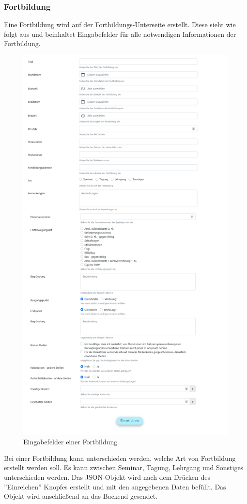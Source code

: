 \subsubsection{Fortbildung}
Eine Fortbildung wird auf der Fortbildungs-Unterseite erstellt. Diese sieht wie folgt aus und beinhaltet Eingabefelder für alle notwendigen Informationen der Fortbildung.
\begin{figure}[H]
	\centering
	\includegraphics[width=0.65\linewidth]{images/workshop}
	\caption[Fortbildung]{Eingabefelder einer Fortbildung}
	\label{fig:workshop}
\end{figure}
\newpage
Bei einer Fortbildung kann unterschieden werden, welche Art von Fortbildung erstellt werden soll. Es kann zwischen Seminar, Tagung, Lehrgang und Sonstiges unterschieden werden. Das JSON-Objekt wird nach dem Drücken des ''Einreichen'' Knopfes erstellt und mit den angegebenen Daten befüllt. Das Objekt wird anschließend an das Backend gesendet.\\

